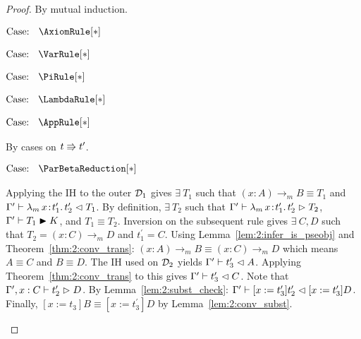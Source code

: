 \begin{proof}
    By mutual induction.

    $\text{Case: }\begin{array}{c} \AxiomRule[*] \end{array}$
    \begin{proofcase}
    \end{proofcase}

    $\text{Case: }\begin{array}{c} \VarRule[*] \end{array}$
    \begin{proofcase}
    \end{proofcase}

    $\text{Case: }\begin{array}{c} \PiRule[*] \end{array}$
    \begin{proofcase}
    \end{proofcase}

    $\text{Case: }\begin{array}{c} \LambdaRule[*] \end{array}$
    \begin{proofcase}
    \end{proofcase}

    $\text{Case: }\begin{array}{c} \AppRule[*] \end{array}$
    \begin{proofcase}
        By cases on $t \Rrightarrow t^\prime$.

        $\text{Case: }\begin{array}{c} \ParBetaReduction[*] \end{array}$
        \begin{proofcase}
            Applying the IH to the outer $\mathcal{D}_{1}$ gives $\exists\ T_1$ such that $(x : A) \to_m B \equiv T_1$ and $\Gamma^\prime \vdash {\lambda_m}\, x\! : \! t_1^\prime.\, t_2^\prime \vartriangleleft T_1$.
            By definition, $\exists\ T_2$ such that $\Gamma^\prime \vdash {\lambda_m}\, x\! : \! t_1^\prime.\, t_2^\prime \vartriangleright T_2$, $\Gamma^\prime \vdash T_1 \blacktriangleright K$, and $T_1 \equiv T_2$.
            Inversion on the subsequent rule gives $\exists\ C, D$ such that $T_2 = (x : C) \to_m D$ and $t_1^\prime = C$.
            Using Lemma~\ref{lem:2:infer_is_pseobj} and Theorem~\ref{thm:2:conv_trans}: $(x : A) \to_m B \equiv (x : C) \to_m D$ which means $A \equiv C$ and $B \equiv D$.
            The IH used on $\mathcal{D}_{2}$ yields $\Gamma^\prime \vdash t_3^\prime \vartriangleleft A$.
            Applying Theorem~\ref{thm:2:conv_trans} to this gives $\Gamma^\prime \vdash t_3^\prime \vartriangleleft C$.
            Note that $\Gamma^\prime, x : C \vdash t_2^\prime \vartriangleright D$.
            By Lemma~\ref{lem:2:subst_check}: $\Gamma^\prime \vdash [x := t_3^\prime]t_2^\prime \vartriangleleft [x := t_3^\prime]D$.
            Finally, $[x := t_3]B \equiv [x := t_3^\prime]D$ by Lemma~\ref{lem:2:conv_subst}.
        \end{proofcase}


\end{proofcase}
\end{proof}
